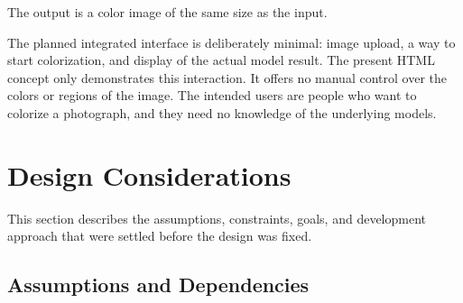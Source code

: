 \documentclass{FastFyp}
\begin{document}
The output is a color image of the same size as the input.

The planned integrated interface is deliberately minimal: image upload, a way to start colorization, and display of the actual model result. The present HTML concept only demonstrates this interaction. It offers no manual control over the colors or regions of the image. The intended users are people who want to colorize a photograph, and they need no knowledge of the underlying models.


\section{Design Considerations}
\label{sec:considerations}

This section describes the assumptions, constraints, goals, and development approach that were settled before the design was fixed.

\subsection{Assumptions and Dependencies}
\end{document}
